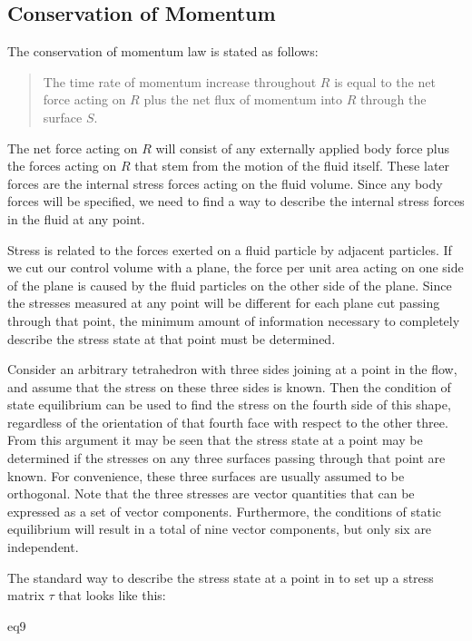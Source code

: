 \subsection{Conservation of Momentum}

The conservation of momentum law is stated as follows:

\begin{quote}
The time rate of momentum increase throughout $R$ is equal to the net force
acting on $R$ plus the net flux of momentum into $R$ through the surface $S$.
\end{quote}

The net force acting on $R$ will consist of any externally applied body force
plus the forces acting on $R$ that stem from the motion of the fluid itself.
These later forces are the internal stress forces acting on the fluid volume.
Since any body forces will be specified, we need to find a way to describe the
internal stress forces in the fluid at any point.  

Stress is related to the forces exerted on a fluid particle by adjacent
particles. If we cut our control volume with a plane, the force per unit area
acting on one side of the plane is caused by the fluid particles on the other
side of the plane. Since  the stresses measured at any point will be different
for each plane cut passing through that point, the minimum amount of
information necessary to completely describe the stress state at that point
must be determined.

Consider an arbitrary tetrahedron with three sides joining at a point in the
flow, and assume that the stress on these three sides is known. Then the
condition of state equilibrium can be used to find the stress on the fourth
side of this shape, regardless of the orientation of that fourth face with
respect to the other three. From this argument it may be seen that the stress
state at a point may be determined if the stresses on any three surfaces
passing through that point are known. For convenience, these three surfaces are
usually assumed to be orthogonal. Note that the three stresses are vector
quantities that can be expressed as a set of vector components. Furthermore,
the conditions of static equilibrium will result in a total of nine vector
components, but only six are independent.

The standard way to describe the stress state at a point in to set up a stress
matrix $\tau$ that looks like this:

{eq9}

